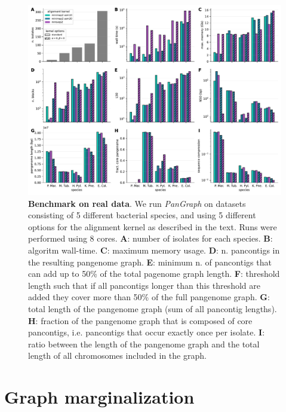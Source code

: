 \documentclass[aps,rmp,reprint,superscriptaddress,notitlepage,10pt,onecolumn]{revtex4-1}
\begin{document}
\begin{figure}[htb]
    \includegraphics[width=\textwidth]{figs_suppl/panx_benchmark_suppl.pdf}
    \caption{{\bf Benchmark on real data}. We run \textit{PanGraph} on datasets consisting of 5 different bacterial species, and using 5 different options for the alignment kernel as described in the text. Runs were performed using 8 cores.
        \textbf{A}: number of isolates for each species.
        \textbf{B}: algoritm wall-time.
        \textbf{C}: maximum memory usage.
        \textbf{D}: n. pancontigs in the resulting pangenome graph.
        \textbf{E}: minimum n. of pancontigs that can add up to 50\% of the total pagenome graph length.
        \textbf{F}: threshold length such that if all pancontigs longer than this threshold are added they cover more than 50\% of the full pangenome graph.
        \textbf{G}: total length of the pangenome graph (sum of all pancontig lengths).
        \textbf{H}: fraction of the pangenome graph that is composed of core pancontigs, i.e. pancontigs that occur exactly once per isolate.
        \textbf{I}: ratio between the length of the pangenome graph and the total length of all chromosomes included in the graph.
    }
    \label{fig:panx-benchmark-suppl}
\end{figure}



\section{Graph marginalization}

\end{document}
